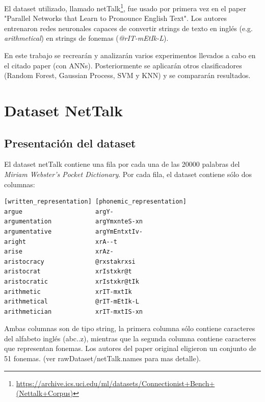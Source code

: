 \documentclass[paper=a4, fontsize=11pt]{scrartcl} %
\numberwithin{equation}{section} %
\numberwithin{figure}{section} %
\numberwithin{table}{section} %
\begin{document}
\par El dataset utilizado, llamado netTalk\footnote{\url{https://archive.ics.uci.edu/ml/datasets/Connectionist+Bench+(Nettalk+Corpus)}}, fue usado por primera vez en el paper  "Parallel Networks that Learn to Pronounce English Text"\cite{parallel}. Los autores entrenaron redes neuronales capaces de convertir strings de texto en inglés (e.g. \textit{arithmetical}) en strings de fonemas (\textit{@rIT-mEtIk-L}).\\


	

    

\par En este trabajo se recrearán y analizarán varios experimentos llevados a cabo en el citado paper (con ANNs). Posteriormente se aplicarán otros clasificadores (Random Forest, Gaussian Process, SVM y KNN) y se compararán resultados.

\section{Dataset NetTalk}

\subsection{Presentación del dataset}
El dataset netTalk contiene una fila por cada una de las 20000 palabras del \textit{Miriam Webster’s Pocket Dictionary}. Por cada fila, el dataset contiene sólo dos columnas: \\

\begin{center}

\begin{BVerbatim}
[written_representation] [phonemic_representation]
argue                    argY-   
argumentation            argYmxnteS-xn   
argumentative            argYmEntxtIv-   
aright                   xrA--t   
arise                    xrAz-   
aristocracy              @rxstakrxsi   
aristocrat               xrIstxkr@t   
aristocratic             xrIstxkr@tIk   
arithmetic               xrIT-mxtIk   
arithmetical             @rIT-mEtIk-L   
arithmetician            xrIT-mxtIS-xn   
\end{BVerbatim}

\end{center}

Ambas columnas son de tipo string, la primera columna sólo contiene caracteres del alfabeto inglés (abc..z), mientras que la segunda columna contiene caracteres que representan fonemas. Los autores del paper original eligieron un conjunto de 51 fonemas. (ver rawDataset/netTalk.names para mas detalle).\\
\end{document}
